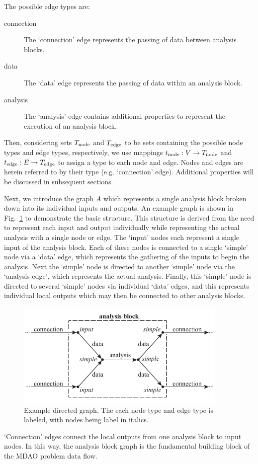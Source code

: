 The possible edge types are:
\begin{description}
\item[connection] The `connection' edge represents the passing of data between analysis blocks.
\item[data] The `data' edge represents the passing of data within an analysis block.
\item[analysis] The `analysis' edge contains additional properties to represent the execution of an analysis block.
\end{description}
Then, considering sets $T_\textrm{node}$ and $T_\textrm{edge}$ to be sets containing the possible node types and edge types, respectively, we use mappings $t_\textrm{node}:V \to T_\textrm{node}$ and $t_\textrm{edge}:E \to T_\textrm{edge}$ to assign a type to each node and edge. Nodes and edges are herein referred to by their type (e.g. `connection' edge). Additional properties will be discussed in subsequent sections.

Next, we introduce the graph $A$ which represents a single analysis block broken down into its individual inputs and outputs. An example graph is shown in Fig.~\ref{f:analysis block} to demonstrate the basic structure. This structure is derived from the need to represent each input and output individually while representing the actual analysis with a single node or edge. The `input' nodes each represent a single input of the analysis block. Each of these nodes is connected to a single `simple' node via a `data' edge, which represents the gathering of the inputs to begin the analysis. Next the `simple' node is directed to another `simple' node via the `analysis edge', which represents the actual analysis. Finally, this `simple' node is directed to several `simple' nodes via individual `data' edges, and this represents individual local outputs which may then be connected to other analysis blocks.
\begin{figure}[htb!]
	\begin{center}
	\includegraphics[width=4in]{images/analysis_block}
	\end{center}
	\vspace{-20pt}
\caption{Example directed graph. The each node type and edge type is labeled, with nodes being label in italics.}
\label{f:analysis block}
\end{figure}
`Connection' edges connect the local outputs from one analysis block to input nodes. In this way, the analysis block graph is the fundamental building block of the MDAO problem data flow.

